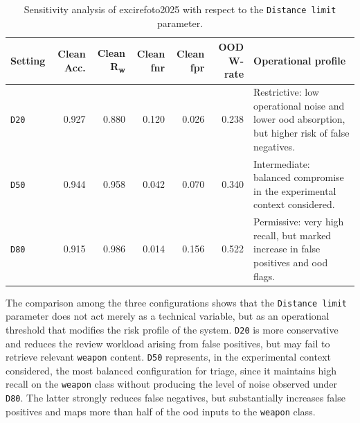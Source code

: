 \begin{table}[H]
\centering
\scriptsize
\renewcommand{\arraystretch}{1.15}
\setlength{\tabcolsep}{4pt}
\caption{Sensitivity analysis of \gls{excirefoto2025} with respect to the \texttt{Distance limit} parameter.}
\label{tab:results-excire-sensitivity}
\begin{tabularx}{0.95\textwidth}{@{}l r r r r r X@{}}
\toprule
\textbf{Setting} &
\textbf{Clean Acc.} &
\textbf{Clean R\textsubscript{w}} &
\textbf{Clean \gls{fnr}} &
\textbf{Clean \gls{fpr}} &
\textbf{OOD W-rate} &
\textbf{Operational profile} \\
\midrule

\texttt{D20} &
0.927 &
0.880 &
0.120 &
0.026 &
0.238 &
Restrictive: low operational noise and lower \gls{ood} absorption, but higher
risk of false negatives. \\

\texttt{D50} &
0.944 &
0.958 &
0.042 &
0.070 &
0.340 &
Intermediate: balanced compromise in the experimental context considered. \\

\texttt{D80} &
0.915 &
0.986 &
0.014 &
0.156 &
0.522 &
Permissive: very high recall, but marked increase in false positives and
\gls{ood} flags. \\

\bottomrule
\end{tabularx}
\end{table}

The comparison among the three configurations shows that the
\texttt{Distance limit} parameter does not act merely as a technical variable,
but as an operational threshold that modifies the risk profile of the system.
\texttt{D20} is more conservative and reduces the review workload arising from
false positives, but may fail to retrieve relevant \texttt{weapon} content.
\texttt{D50} represents, in the experimental context considered, the most
balanced configuration for triage, since it maintains high recall on the
\texttt{weapon} class without producing the level of noise observed under
\texttt{D80}. The latter strongly reduces false negatives, but substantially
increases false positives and maps more than half of the \gls{ood} inputs to
the \texttt{weapon} class.

